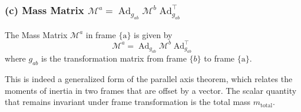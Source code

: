 \subsubsection*{(c) Mass Matrix \( \mathcal{M}^{a}=\operatorname{Ad}_{g_{a b}} \mathcal{M}^{b} \operatorname{Ad}_{g_{a b}}^{\top} \)}

The Mass Matrix \( \mathcal{M}^{a} \) in frame \( \{\mathrm{a}\} \) is given by
\begin{equation*}
    \mathcal{M}^{a}=\operatorname{Ad}_{g_{a b}} \mathcal{M}^{b} \operatorname{Ad}_{g_{a b}}^{\top}
\end{equation*}
where \( g_{a b} \) is the transformation matrix from frame \( \{b\} \) to frame \( \{\mathrm{a}\} \).

This is indeed a generalized form of the parallel axis theorem, which relates the moments of inertia in two frames that are offset by a vector.
The scalar quantity that remains invariant under frame transformation is the total mass \( m_{\text{total}} \).
